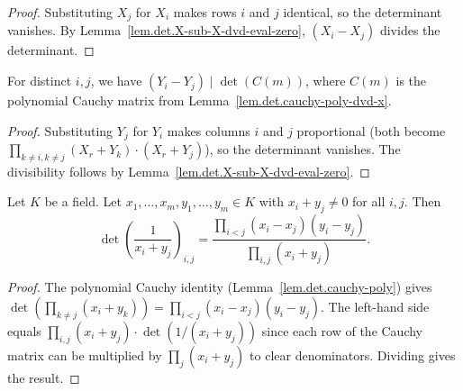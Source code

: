 \begin{proof}
\leanok
Substituting $X_j$ for $X_i$ makes rows $i$ and $j$ identical, so the
determinant vanishes. By Lemma~\ref{lem.det.X-sub-X-dvd-eval-zero},
$(X_i - X_j)$ divides the determinant.
\end{proof}

\begin{lemma}
\label{lem.det.cauchy-poly-dvd-y}
\leanhelper
\leanok
For distinct $i, j$, we have
$(Y_i - Y_j) \mid \det(C(m))$,
where $C(m)$ is the polynomial Cauchy matrix from Lemma~\ref{lem.det.cauchy-poly-dvd-x}.
\end{lemma}

\begin{proof}
\leanok
Substituting $Y_j$ for $Y_i$ makes columns $i$ and $j$ proportional
(both become $\prod_{k \neq i, k \neq j}(X_r + Y_k) \cdot (X_r + Y_j)$),
so the determinant vanishes. The divisibility follows by
Lemma~\ref{lem.det.X-sub-X-dvd-eval-zero}.
\end{proof}

\begin{lemma}
\label{lem.det.cauchy-det-of-poly}
\leanhelper
\leanok
Let $K$ be a field. Let $x_1, \ldots, x_m, y_1, \ldots, y_m \in K$ with
$x_i + y_j \neq 0$ for all $i, j$. Then
\[
  \det\!\left(\frac{1}{x_i + y_j}\right)_{i,j}
  = \frac{\prod_{i < j}(x_i - x_j)(y_i - y_j)}{\prod_{i,j}(x_i + y_j)}.
\]
\end{lemma}

\begin{proof}
The polynomial Cauchy identity (Lemma~\ref{lem.det.cauchy-poly}) gives
$\det(\prod_{k \neq j}(x_i + y_k)) = \prod_{i < j}(x_i - x_j)(y_i - y_j)$.
The left-hand side equals $\prod_{i,j}(x_i + y_j) \cdot \det(1/(x_i + y_j))$
since each row of the Cauchy matrix can be multiplied by
$\prod_j (x_i + y_j)$ to clear denominators. Dividing gives the result.
\end{proof}

